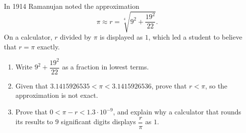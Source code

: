 In 1914 Ramanujan noted the approximation
\[\pi\approx r=\sqrt[4]{9^2+\dfrac{19^2}{22}}.\]
On a calculator, $r$ divided by $\pi$ is displayed as $1$, which led a student to believe that $r=\pi$ exactly.
\begin{enumerate}
\item[(a)] Write $9^2+\dfrac{19^2}{22}$ as a fraction in lowest terms.
\item[(b)] Given that $3.1415926535<\pi<3.1415926536$, prove that $r<\pi$, so the approximation is not exact.
\item[(c)] Prove that $0<\pi-r<1.3\cdot10^{-9}$, and explain why a calculator that rounds its results to $9$ significant digits displays $\dfrac r\pi$ as $1$.
\end{enumerate}
